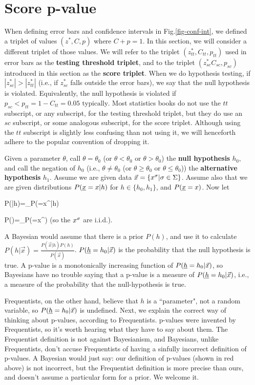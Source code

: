 \section{Score p-value}
\label{sec0-score-p-value}
When defining error bars
and confidence intervals in 
Fig.\ref{fig-conf-int},
we defined a triplet 
of values $(z^*, C, p)$
where $C+p=1$.
In this section,
we will consider a different triplet
of those values.
We will refer to the triplet
$(z^*_{tt}, C_{tt}, p_{tt})$
used in error bars as the {\bf testing threshold triplet}, and to
the triplet 
$(z^*_{sc} C_{sc}, p_{sc})$
introduced in this section as the
{\bf score triplet}.
When we do hypothesis testing,
if $|z^*_{sc}|> |z^*_{tt}|$
(i.e., if $z^*_{sc}$
falls outside
the error bars),
we say that the null
hypothesis is violated.
Equivalently, the null
hypothesis is violated
if $p_{sc}<p_{tt}=1-C_{tt}=0.05 \text{ typically}$.
Most statistics books
do not use the $tt$ subscript,
or any subscript,
for the testing threshold 
triplet,
but they do use an $sc$ subscript,
or some analogous subscript,
for the score triplet.
Although using the $tt$
subscript
is slightly less 
confusing than not using it,
we will henceforth 
adhere to the
popular convention
of dropping it.




Given a parameter $\theta$, call
$\theta=\theta_0$ (or  $\theta<\theta_0$ or $\theta>\theta_0$) the
{\bf null hypothesis} $h_0$,
and call the negation of $h_0$ (i.e., 
$\theta\neq\theta_0$ (or  $\theta\geq\theta_0$ or $\theta\leq \theta_0$))
the {\bf alternative hypothesis} $h_1$.
Assume we
are given data $\vec{x}=\{x^\sigma|\sigma\in \Sigma\}$. Assume
also that we are given
distributions $P({\underline{x}}=x|h)$ for $h\in \{h_0, h_1\}$,
and $P({\underline{x}}=x)$. Now let

\beq
P(|h)=\prod_\s P(\rvx=x^\s|h)
\eeq


\beq
P()=\prod_\s P(\rvx=x^\s)
\eeq
(so the $x^\sigma$ are i.i.d.).

A Bayesian would assume that there
is a prior $P(h)$, and use it to
calculate
$P(h|\vec{x})=\frac{P(\vec{x}|h) P(h)}{P(\vec{x})}$.
$P({\underline{h}}= h_0|\vec{x})$
is the probability that the null hypothesis is true.
A p-value is a monotonically increasing function of
$P({\underline{h}}= h_0|\vec{x})$,
so Bayesians have no trouble saying
that  {\color{red} a p-value is
a measure of
$P({\underline{h}}= h_0|\vec{x})$, i.e.,
a measure of the probability that
the null-hypothesis is true}.

Frequentists, on the other hand,
believe that $h$
is a ``parameter", not a random variable,
so  $P({\underline{h}}= h_0|\vec{x})$
is undefined.
Next, we explain the correct
way of thinking about p-values, according to
Frequentists.
p-values were invented by Frequentists,
so it's worth hearing what they have to say
about them.
The Frequentist definition is not against Bayesianism,
and Bayesians, unlike Frequentists,
 don't accuse Frequentists of
having a sinfully incorrect
 definition of p-values. A Bayesian would just say:
our definition of p-values (shown
in red above) is not incorrect,
but the Frequentist definition is more precise than ours,
and doesn't assume a particular form for a prior.
We welcome it.

